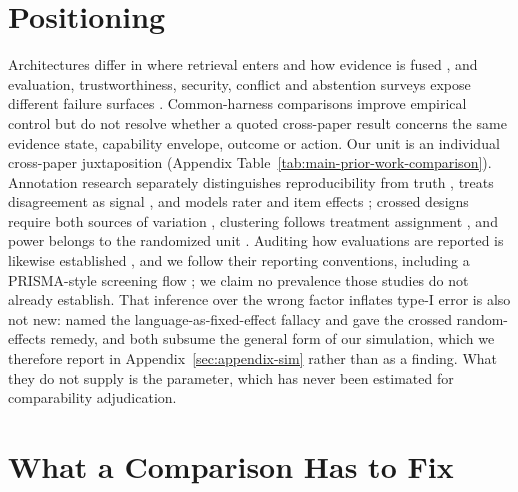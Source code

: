 \documentclass[11pt]{article}
\begin{document}
\section{Positioning}
\label{sec:related}

Architectures differ in where retrieval enters and how evidence is fused
\citep{drqa2017,knnlm2020,fid2021,retro2022,atlas2023,replug2024}, and
evaluation, trustworthiness, security, conflict and abstention surveys expose
different failure surfaces \citep{ragSurvey2024,ragEvaluationSurvey2024,
trustRAGCompass2024,securityRAGSurvey2026,xuKnowledgeConflicts2024,
wenAbstentionSurvey2025}. Common-harness comparisons improve empirical control
\citep{ragBestPractices2024,alushiRAGComparison2026} but do not resolve whether
a quoted cross-paper result concerns the same evidence state, capability
envelope, outcome or action. Our unit is an individual cross-paper
juxtaposition (Appendix Table~\ref{tab:main-prior-work-comparison}). Annotation
research separately distinguishes reproducibility from truth
\citep{artstein2008intercoder,dawid1979observer}, treats disagreement as signal
\citep{uma2021disagreement,plank2022labelvariation,davani2022disagreements},
and models rater and item effects
\citep{passonneau2014annotation,paun2018bayesian}; crossed designs require both
sources of variation \citep{baayen2008crossed}, clustering follows treatment
assignment \citep{abadie2023clustering}, and power belongs to the randomized
unit \citep{card2020power,vanmiltenburg2021preregistering}. Auditing how
evaluations are reported is likewise established
\citep{howcroft2020twenty,vanderlee2021human,belz2021systematic,
belz2023impossibility,clark2021human}, and we follow their reporting
conventions, including a PRISMA-style screening flow
\citep{page2021prisma}; we claim no prevalence those studies do not already
establish. That inference over the wrong factor inflates type-I error is also
not new: \citet{clark1973language} named the language-as-fixed-effect fallacy
and \citet{judd2012stimuli} gave the crossed random-effects remedy, and both
subsume the general form of our simulation, which we therefore report in
Appendix~\ref{sec:appendix-sim} rather than as a finding. What they do not
supply is the parameter, which has never been estimated for comparability
adjudication.

\section{What a Comparison Has to Fix}
\label{sec:estimands}
\end{document}

